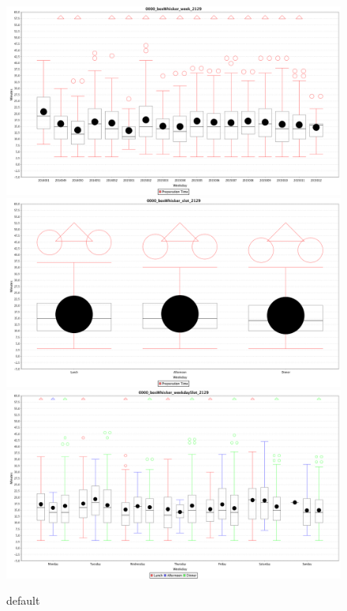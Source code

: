 \begin{figure}[htp]

\centering
\includegraphics[width=.3\textwidth]{images/0000_boxWhisker_week_2129.png}\hfill
\includegraphics[width=.3\textwidth]{images/0000_boxWhisker_slot_2129.png}\hfill
\includegraphics[width=.3\textwidth]{images/0000_boxWhisker_weekdaySlot_2129.png}

\caption{default}
\label{fig:figure3}

\end{figure}

